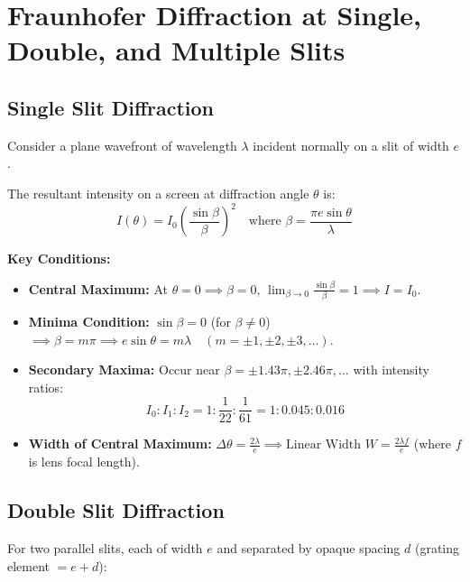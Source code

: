 \documentclass[12pt,a4paper]{article}
\begin{document}
\section{Fraunhofer Diffraction at Single, Double, and Multiple Slits}

\subsection{Single Slit Diffraction}

Consider a plane wavefront of wavelength $\lambda$ incident normally on a slit of width $e$.

\begin{tcolorbox}[formulabox, title={\textbf{Single Slit Intensity Formula}}]
The resultant intensity on a screen at diffraction angle $\theta$ is:
\begin{equation}
I(\theta) = I_0 \left(\frac{\sin \beta}{\beta}\right)^2 \quad \text{where } \beta = \frac{\pi e \sin \theta}{\lambda}
\end{equation}
\end{tcolorbox}

\textbf{Key Conditions:}\par\noindent
\begin{itemize}[leftmargin=*, itemsep=3pt]
  \item \textbf{Central Maximum:} At $\theta = 0 \implies \beta = 0$, $\lim_{\beta\to 0} \frac{\sin\beta}{\beta} = 1 \implies I = I_0$.
  \item \textbf{Minima Condition:} $\sin \beta = 0$ (for $\beta \neq 0$) $\implies \beta = m \pi \implies e \sin \theta = m \lambda \quad (m = \pm 1, \pm 2, \pm 3, \ldots)$.
  \item \textbf{Secondary Maxima:} Occur near $\beta = \pm 1.43 \pi, \pm 2.46 \pi, \dots$ with intensity ratios:
  \begin{equation}
  I_0 : I_1 : I_2 = 1 : \frac{1}{22} : \frac{1}{61} = 1 : 0.045 : 0.016
  \end{equation}
  \item \textbf{Width of Central Maximum:} $\Delta \theta = \frac{2 \lambda}{e} \implies \text{Linear Width } W = \frac{2 \lambda f}{e}$ (where $f$ is lens focal length).
\end{itemize}

\subsection{Double Slit Diffraction}

For two parallel slits, each of width $e$ and separated by opaque spacing $d$ (grating element $= e + d$):
\end{document}

